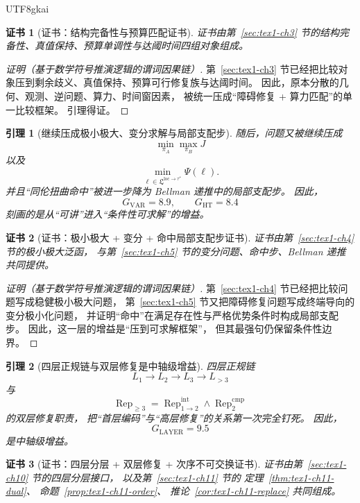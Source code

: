 \documentclass[12pt]{article}
\newtheorem{lemma}{引理}[section]
\newtheorem{Certificate}{证书}[section]
\begin{document}
\begin{CJK*}{UTF8}{gkai}
\begin{Certificate}[证书：结构完备性与预算匹配证书]
\label{cert:tex1-ch6-cb}
证书由第~\ref{sec:tex1-ch3} 节的结构完备性、真值保持、预算单调性与达阈时间四组对象组成。
\end{Certificate}

\begin{proof}[证明（基于数学符号推演逻辑的谓词因果链）]
第~\ref{sec:tex1-ch3} 节已经把比较对象压到剩余歧义、真值保持、预算可行修复族与达阈时间。
因此，原本分散的几何、观测、逆问题、算力、时间窗因素，
被统一压成“障碍修复 + 算力匹配”的单一比较框架。
引理得证。
\end{proof}

\begin{lemma}[继续压成极小极大、变分求解与局部支配步]
\label{lem:tex1-ch6-varht}
随后，问题又被继续压成
\[
  \min_{\pi_A}\max_{\pi_B}J
\]
以及
\[
  \min_{\ell\in\mathfrak L^{\mathrm{loc}\to\tau^\ast}}\Psi(\ell).
\]
并且“同伦扭曲命中”被进一步降为 Bellman 递推中的局部支配步。
因此，
\[
  G_{\mathrm{VAR}}=8.9,\qquad
  G_{\mathrm{HT}}=8.4
\]
刻画的是从“可讲”进入“条件性可求解”的增益。
\end{lemma}

\begin{Certificate}[证书：极小极大 + 变分 + 命中局部支配步证书]
\label{cert:tex1-ch6-varht}
证书由第~\ref{sec:tex1-ch4} 节的极小极大泛函，
与第~\ref{sec:tex1-ch5} 节的变分问题、命中步、Bellman 递推共同提供。
\end{Certificate}

\begin{proof}[证明（基于数学符号推演逻辑的谓词因果链）]
第~\ref{sec:tex1-ch4} 节已经把比较问题写成稳健极小极大问题，
第~\ref{sec:tex1-ch5} 节又把障碍修复问题写成终端导向的变分极小化问题，
并证明“命中”在满足存在性与严格优势条件时构成局部支配步。
因此，这一层的增益是“压到可求解框架”，
但其最强句仍保留条件性边界。
\end{proof}

\begin{lemma}[四层正规链与双层修复是中轴级增益]
\label{lem:tex1-ch6-layer}
四层正规链
\[
  L_1\to L_2\to L_3\to L_{>3}
\]
与
\[
  \operatorname{Rep}_{\ge 3}
  =
  \operatorname{Rep}^{\mathrm{int}}_{1\to 2}
  \wedge
  \operatorname{Rep}^{\mathrm{cmp}}_{2}
\]
的双层修复职责，
把“首层编码”与“高层修复”的关系第一次完全钉死。
因此，
\[
  G_{\mathrm{LAYER}}=9.5
\]
是中轴级增益。
\end{lemma}

\begin{Certificate}[证书：四层分层 + 双层修复 + 次序不可交换证书]
\label{cert:tex1-ch6-layer}
证书由第~\ref{sec:tex1-ch10} 节的四层分层接口，
以及第~\ref{sec:tex1-ch11} 节的
定理~\ref{thm:tex1-ch11-dual}、
命题~\ref{prop:tex1-ch11-order}、
推论~\ref{cor:tex1-ch11-replace}
共同组成。
\end{Certificate}


\end{CJK*}
\end{document}
